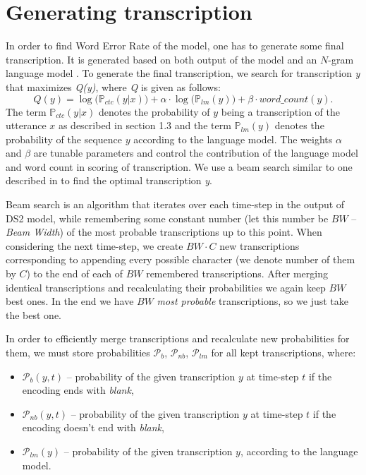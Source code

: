 \documentclass[licencjacka,en]{pracamgr}
\begin{document}
\section{Generating transcription} \label{sec:transcription}
In order to find Word Error Rate of the model, one has to generate some final transcription. It is generated based on both output of the model and an $N$-gram language model \cite{DS9}. To generate the final transcription, we search for transcription \textit{y} that maximizes \textit{Q(y)}, where \textit{Q} is given as follows:
$$
Q(y) = \log \big(\mathbb{P}_{ctc}(y|x)\big) + \alpha \cdot \log \big( \mathbb{P}_{lm}(y) \big) + \beta \cdot word\_count(y).
$$
The term $\mathbb{P}_{ctc}(y|x)$ denotes the probability of $y$ being a transcription of the utterance $x$ as described in section 1.3 and the term $\mathbb{P}_{lm}(y)$ denotes the probability of the sequence $y$ according to the language model. The weights $\alpha$ and $\beta$ are tunable parameters and control the contribution of the language model and word count in scoring of transcription. We use a beam search similar to one described in \cite{DS7} to find the optimal transcription \textit{y}.

Beam search is an algorithm that iterates over each time-step in the output of DS2 model, while remembering some constant number (let this number be $BW$ -- \textit{Beam Width}) of the most probable transcriptions up to this point. When considering the next time-step, we create $BW \cdot C$ new transcriptions corresponding to appending every possible character (we denote number of them by $C$) to the end of each of $BW$ remembered transcriptions. After merging identical transcriptions and recalculating their probabilities we again keep $BW$ best ones. In the end we have $BW$ \textit{most probable} transcriptions, so we just take the best one.

In order to efficiently merge transcriptions and recalculate new probabilities for them, we must store probabilities $\mathcal{P}_{b}$, $\mathcal{P}_{nb}$, $\mathcal{P}_{lm}$ for all kept transcriptions, where:
\begin{itemize}
\item $\mathcal{P}_{b}(y, t)$ -- probability of the given transcription $y$ at time-step $t$ if the encoding ends with \textit{blank},
\item $\mathcal{P}_{nb}(y, t)$ -- probability of the given transcription $y$ at time-step $t$ if the encoding doesn't end with \textit{blank},
\item $\mathcal{P}_{lm}(y)$ -- probability of the given transcription $y$, according to the language model.\\
\end{itemize}
\end{document}
